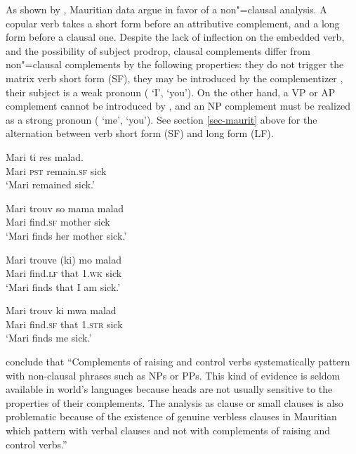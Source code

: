 \documentclass[output=paper
	        ,collection
	        ,collectionchapter
 	        ,biblatex
                ,babelshorthands
                ,newtxmath
                ,draftmode
                ,colorlinks, citecolor=brown
]{langscibook}
\begin{document}
As shown by \citet{HenriandLaurens2011}, Mauritian data argue in favor of a non"=clausal
analysis. A copular verb takes a short form before an attributive complement, and a long form before
a clausal one. Despite the lack of inflection on the embedded verb, and the possibility of subject
prodrop,  clausal complements differ from non"=clausal complements by the following properties: they
do not trigger the matrix verb short form (SF), they may be introduced by the complementizer ,
their subject is a weak pronoun ( `I',  `you'). On the other hand, a VP or AP complement
cannot be introduced by , and an NP complement must be realized as a strong pronoun ( `me',
 `you'). See section \ref{sec-maurit} above for the alternation between verb short form (SF) and long form (LF).

\begin{exe}
\ex \begin{xlist}
\ex 
\gll Mari ti res  malad.\\
     Mari \textsc{pst} remain.\textsc{sf} sick\\\hfill\citep[]{HenriandLaurens2011}
\glt `Mari remained sick.'

\ex 
\gll Mari trouv  so mama malad\\
     Mari find.\textsc{sf} \POSS{} mother sick\\
\glt `Mari finds her mother sick.'

\ex 
\gll Mari trouve (ki) mo malad\\
     Mari find.\textsc{lf} that 1\SG.\textsc{wk} sick\\
\glt `Mari finds that I am sick.'

\ex 
\gll Mari trouv ki mwa malad\\
     Mari find.\textsc{sf} that 1\SG.\textsc{str} sick\\
\glt `Mari finds me sick.'
\end{xlist}
\end{exe}

\citet[]{HenriandLaurens2011} conclude that ``Complements of raising and control verbs systematically pattern with non-clausal phrases such as NPs or PPs. This kind of evidence is seldom available in world's languages because heads are not usually sensitive to the properties of their complements. The analysis as clause or small clauses is also problematic because of the existence of genuine verbless clauses in Mauritian which pattern with verbal clauses and not with complements of raising and control verbs.''
\end{document}
